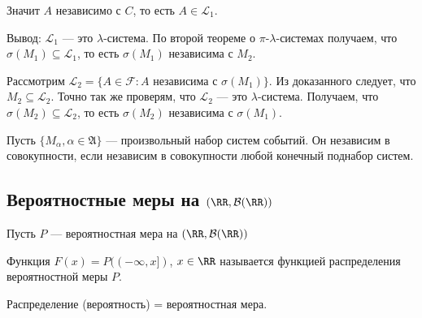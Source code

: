 \begin{itemize}
\begin{enumerate}
                Значит \( A \) независимо с \( C \), то есть \( A \in \mathcal{L_1} \).
        \end{enumerate}

        Вывод: \( \mathcal{L}_1 \) --- это \( \lambda \)-система.
        По второй теореме о \( \pi \)-\( \lambda \)-системах получаем,
        что \( \sigma(M_1) \subseteq \mathcal{L}_1 \),
        то есть \( \sigma(M_1) \) независима с \( M_2 \).

        Рассмотрим \( \mathcal{L}_2 = \{ A \in \mathcal{F} : A \text{ независима с } \sigma(M_1) \} \).
        Из доказанного следует, что \( M_2 \subseteq \mathcal{L}_2 \).
        Точно так же проверям, что \( \mathcal{L}_2 \) --- это \( \lambda \)-система.
        Получаем, что \( \sigma(M_2) \subseteq \mathcal{L}_2 \),
        то есть \( \sigma(M_2) \) независима с \( \sigma(M_1) \).
\end{itemize}

\begin{defn}{}{}
    Пусть \( \{ M_{\alpha}, \alpha \in \mathfrak{A} \} \)
    --- произвольный набор систем событий.
    Он независим в совокупности, если независим в совокупности любой конечный поднабор систем.
\end{defn}

\subsection{Вероятностные меры на \( (\RR, \mathcal{B}(\RR) ) \)}

Пусть \( P \) --- вероятностная мера на \( (\RR, \mathcal{B}(\RR)) \)

\begin{defn}{}{}
    Функция \( F(x) = P ((-\infty, x]) \), \( x \in \RR \) называется
    функцией распределения вероятностной меры \( P \).
\end{defn}

\begin{remark}{}{}
    Распределение (вероятность) = вероятностная мера.
\end{remark}

